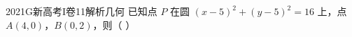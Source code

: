 
\begin{problem}{2021}{G}{新高考I卷}{11}{解析几何}
已知点 $ P $ 在圆 $ (x-5)^2+(y-5)^2=16 $ 上，点 $ A(4,0) $，$ B(0,2) $，则（ ）
\begin{choices}
\end{choices}
\end{problem}

\begin{answer}

\end{answer}

\begin{solutions}

\end{solutions}
